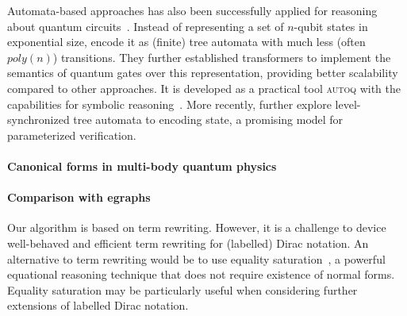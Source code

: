 Automata-based approaches has also been successfully applied for
reasoning about quantum circuits~\cite{AutoQ_pldi_2023}. Instead of
representing a set of $n$-qubit states in exponential size,
\cite{AutoQ_pldi_2023} encode it as (finite) tree automata with much
less (often $\mathit{poly}(n)$) transitions.  They further established
transformers to implement the semantics of quantum gates over this
representation, providing better scalability compared to other
approaches. It is developed as a practical tool \textsc{autoq} with
the capabilities for symbolic reasoning~\cite{AutoQ2023}. More
recently, \cite{AutoQ_popl2025} further explore level-synchronized
tree automata to encoding state, a promising model for parameterized
verification.


\paragraph*{Canonical forms in multi-body quantum physics}

\paragraph*{Comparison with egraphs}
Our algorithm is based on term rewriting. However, it is a challenge
to device well-behaved and efficient term rewriting for (labelled)
Dirac notation. An alternative to term rewriting would be to use
equality saturation~\cite{DBLP:journals/pacmpl/WillseyNWFTP21}, a
powerful equational reasoning technique that does not require
existence of normal forms. Equality saturation may be particularly
useful when considering further extensions of labelled Dirac notation.



